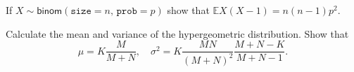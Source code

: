 \begin{xca}
\label{xca-binom-factorial-expectation} If
\(X\sim\mathsf{binom}(\mathtt{size}=n,\,\mathtt{prob}=p)\) show that
\(\mathbb{E} X(X - 1) = n(n - 1)p^{2}\).
\end{xca}

\begin{xca}
\label{xca-hyper-mean-variance} Calculate the mean and variance of the
hypergeometric distribution. Show that
\begin{equation}
\mu=K\frac{M}{M + N},\quad \sigma^{2} = K\frac{MN}{(M + N)^{2}}\frac{M + N - K}{M + N - 1}.
\end{equation}
\end{xca}
